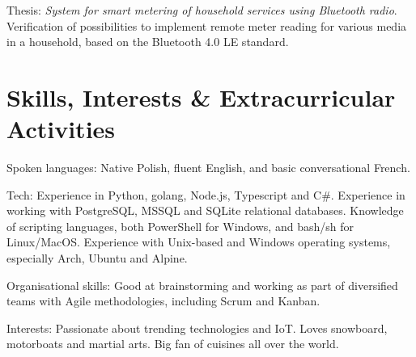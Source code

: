 \documentclass[12pt,english]{resume}
\begin{document}


			\noindent
			Thesis: \emph{System for smart metering of household services using Bluetooth radio}.
			Verification of possibilities to implement remote meter reading for various media in a household, based on the Bluetooth 4.0 LE standard.

	\section{Skills, Interests \& Extracurricular Activities}
		Spoken languages: Native Polish, fluent English, and basic conversational French.

		\noindent
		Tech: Experience in Python, golang, Node.js, Typescript and C\#. Experience in working with PostgreSQL, MSSQL and SQLite relational databases. Knowledge of scripting languages, both PowerShell for Windows, and bash/sh for Linux/MacOS. Experience with Unix-based and Windows operating systems, especially Arch, Ubuntu and Alpine.

		\noindent
		Organisational skills: Good at brainstorming and working as part of diversified teams with Agile methodologies, including Scrum and Kanban.

		\noindent
		Interests: Passionate about trending technologies and IoT. Loves snowboard, motorboats and martial arts. Big fan of cuisines all over the world.
\end{document}
